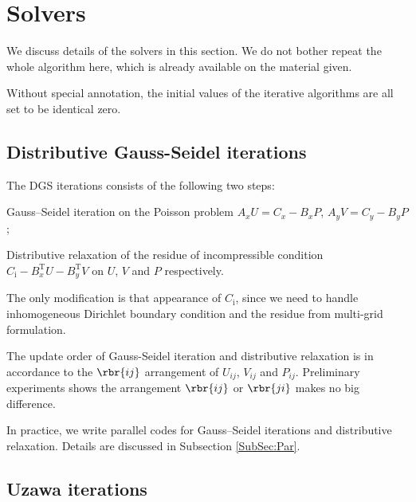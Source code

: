 \documentclass[english, nochinese]{pnote}
\begin{document}
\section{Solvers}

We discuss details of the solvers in this section. We do not bother repeat the whole algorithm here, which is already available on the material given.

Without special annotation, the initial values of the iterative algorithms are all set to be identical zero.

\subsection{Distributive Gauss-Seidel iterations}

The DGS iterations consists of the following two steps:
\begin{partlist}
\item Gauss--Seidel iteration on the Poisson problem $ A_x U = C_x - B_x P $, $ A_y V = C_y - B_y P $;
\item Distributive relaxation of the residue of incompressible condition $ C_{\text{i}} - B_x^{\text{T}} U - B_y^{\text{T}} V $ on $U$, $V$ and $P$ respectively.
\end{partlist}
The only modification is that appearance of $C_{\text{i}}$, since we need to handle inhomogeneous Dirichlet boundary condition and the residue from multi-grid formulation.

The update order of Gauss-Seidel iteration and distributive relaxation is in accordance to the $ \rbr{ i j } $ arrangement of $ U_{ i j } $, $ V_{ i j } $ and $ P_{ i j } $. Preliminary experiments shows the arrangement $ \rbr{ i j } $ or $ \rbr{ j i } $ makes no big difference.

In practice, we write parallel codes for Gauss--Seidel iterations and distributive relaxation. Details are discussed in Subsection \ref{SubSec:Par}.

\subsection{Uzawa iterations}
\end{document}
